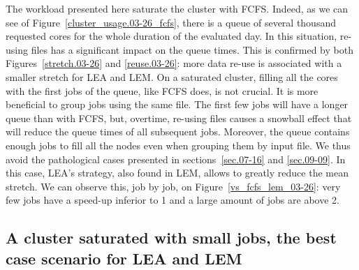 \documentclass[conference,10pt]{IEEEtran}
\begin{document}
The workload presented here saturate the cluster with FCFS. 
Indeed, as we can see of Figure~\ref{cluster_usage.03-26_fcfs}, there is a queue of several thousand requested cores
for the whole duration of the evaluated day.
In this situation, re-using files has a significant impact
on the queue times. This is confirmed by both Figures~\ref{stretch.03-26} and \ref{reuse.03-26}:
more data re-use is associated with a smaller stretch for LEA and LEM.
On a saturated cluster, filling all the cores with the first jobs of the queue, like FCFS does, is not crucial.
It is more beneficial to group jobs using the same file.
The first few jobs will have a longer queue than with FCFS,
but, overtime, re-using files causes a snowball effect that will reduce the 
queue times of all subsequent jobs.
Moreover, the queue contains enough jobs to fill all the nodes even when grouping them by input file.
We thus avoid the pathological cases presented in sections~\ref{sec.07-16} and \ref{sec.09-09}.
In this case, LEA's strategy, also found in LEM, allows to greatly reduce the mean stretch.
We can observe this, job by job, on Figure~\ref{vs_fcfs_lem_03-26}: very few jobs 
have a speed-up inferior to 1 and a large amount of jobs are above 2. 

\subsection{A cluster saturated with small jobs, the best case scenario for LEA and LEM}\label{sec.08-16}
\end{document}
